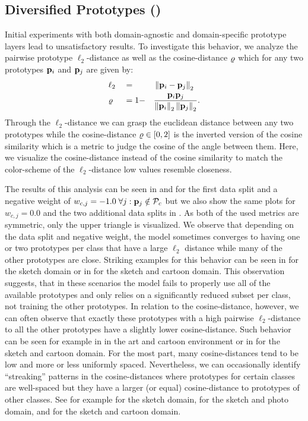 \subsection{Diversified Prototypes (\prodrop)}
\label{sec:divpro}

Initial experiments with both domain-agnostic and domain-specific prototype layers lead to unsatisfactory results. To investigate this behavior, we analyze the pairwise prototype $\ell_2$-distance as well as the cosine-distance $\varrho$ which for any two prototypes $\mathbf{p}_i$ and $\mathbf{p}_{j}$ are given by:
\begin{alignat}{3}
\label{eq:pairwise_prot_distances}
    &\ell_2 &&= &&\left\|\mathbf{p}_i - \mathbf{p}_{j}  \right\|_2\\ 
    &\varrho &&= 1- &&\frac{\mathbf{p}_i\mathbf{p}_{j}}{\left\|\mathbf{p}_i \right\|_2 \left\|\mathbf{p}_{j} \right\|_2} .
\end{alignat}
Through the $\ell_2$-distance we can grasp the euclidean distance between any two prototypes while the cosine-distance $\varrho \in [0,2]$ is the inverted version of the cosine similarity which is a metric to judge the cosine of the angle between them. Here, we visualize the cosine-distance instead of the cosine similarity to match the color-scheme of the $\ell_2$-distance \ie low values resemble closeness. 

The results of this analysis can be seen in  and  for the first data split and a negative weight of $w_{c,j} = -1.0\; \forall j: \mathbf{p}_{j} \notin \mathcal{P}_c$ but we also show the same plots for $w_{c,j} = 0.0$ and the two additional data splits in . As both of the used metrics are symmetric, only the upper triangle is visualized. We observe that depending on the data split and negative weight, the model sometimes converges to having one or two prototypes per class that have a large $\ell_2$ distance while many of the other prototypes are close. Striking examples for this behavior can be seen in  for the sketch domain or in  for the sketch and cartoon domain. This observation suggests, that in these scenarios the model fails to properly use all of the available prototypes and only relies on a significantly reduced subset per class, not training the other prototypes. In relation to the cosine-distance, however, we can often observe that exactly these prototypes with a high pairwise $\ell_2$-distance to all the other prototypes have a slightly lower cosine-distance. Such behavior can be seen for example in  in the art and cartoon environment or in  for the sketch and cartoon domain. For the most part, many cosine-distances tend to be low and more or less uniformly spaced. Nevertheless, we can occasionally identify ``streaking'' patterns in the cosine-distances where prototypes for certain classes are well-spaced but they have a larger (or equal) cosine-distance to prototypes of other classes. See for example  for the sketch domain,  for the sketch and photo domain, and   for the sketch and cartoon domain.

